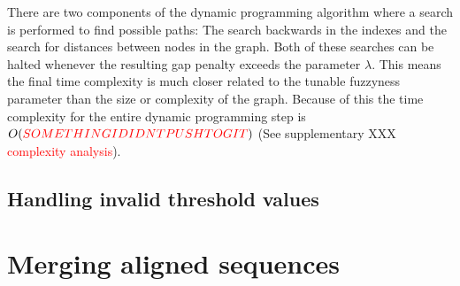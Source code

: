 \documentclass{article}
\begin{document}
\par\noindent
There are two components of the dynamic programming algorithm where a search is performed to find possible paths: The search backwards in the indexes and the search for distances between nodes in the graph. Both of these searches can be halted whenever the resulting gap penalty exceeds the parameter $\lambda$. This means the final time complexity is much closer related to the tunable fuzzyness parameter than the size or complexity of the graph. Because of this the time complexity for the entire dynamic programming step is $O(\textcolor{red}{SOMETHING I DIDNT PUSH TO GIT})$ (See supplementary XXX \textcolor{red}{complexity analysis}).
\subsection{Handling invalid threshold values}
\section{Merging aligned sequences}
\end{document}
